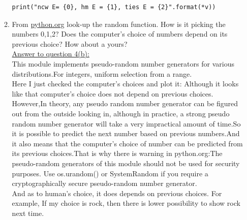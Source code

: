 \documentclass{article}
\begin{document}
\begin{enumerate}
\begin{enumerate}
\begin{verbatim}
print("ncw E= {0}, hm E = {1}, ties E = {2}".format(*v))
\end{verbatim}
\item From \url{python.org} look-up the random function.  How is it picking the numbers 0,1,2?  Does the computer's choice of numbers depend on its previous choice? How about a yours?\\
\underline{Answer to question 4(b):}\\
This module implements pseudo-random number generators for various distributions.For integers, uniform selection from a range.\\
Here I just checked the computer's choices and plot it:  Although it looks like that computer's choice does not depend on previous choices. However,In theory, any pseudo random number generator can be figured out from the outside looking in, although in practice, a strong pseudo random number generator will take a very impractical amount of time.So it is possible to predict the next number based on previous numbers.And it also means that the computer's choice of number can be predicted from its previous choices.That is why there is warning in python.org:The pseudo-random generators of this module should not be used for security purposes. Use os.urandom() or SystemRandom if you require a cryptographically secure pseudo-random number generator.\\
And as to human's choice, it does depends on previous choices. For example, If my choice is rock, then there is lower possibility to show rock next time. \\


\end{enumerate}
\end{enumerate}
\end{document}
